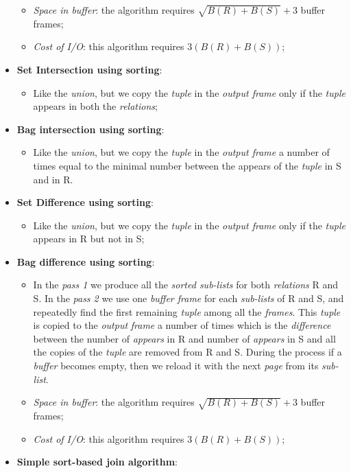 \documentclass{article}
\begin{document}
\begin{itemize}
\begin{itemize}
\item \emph{Space in buffer}: the algorithm requires $\sqrt{B(R) +B(S)} +3$ buffer frames;
\item \emph{Cost of I/O}: this algorithm requires $3(B(R)+B(S))$;
\end{itemize}
\item \textbf{Set Intersection using sorting}:
\begin{itemize}
\item Like the \emph{union}, but we copy the \emph{tuple} in the \emph{output frame} only if the \emph{tuple} appears in both the \emph{relations};
\end{itemize}
\item \textbf{Bag intersection using sorting}:
\begin{itemize}
\item Like the \emph{union}, but we copy the \emph{tuple} in the \emph{output frame} a number of times equal to the minimal number between the appears of the \emph{tuple} in S and in R. 
\end{itemize}
\item \textbf{Set Difference using sorting}:
\begin{itemize}
\item Like the \emph{union}, but we copy the \emph{tuple} in the \emph{output frame} only if the \emph{tuple} appears in R but not in S;
\end{itemize}
\item \textbf{Bag difference using sorting}:
\begin{itemize}
\item In the\emph{ pass 1} we produce all the \emph{sorted sub-lists} for both \emph{relations} R and S. In the \emph{pass 2} we use one \emph{buffer frame} for each \emph{sub-lists} of R and S, and repeatedly find the first remaining \emph{tuple} among all the \emph{frames}. This \emph{tuple} is copied to the \emph{output} \emph{frame} a number of times which is the \emph{difference} between the number of \emph{appears} in R and number of \emph{appears} in S and all the copies of the \emph{tuple} are removed from R and S. During the process if a \emph{buffer} becomes empty, then we reload it with the next \emph{page} from its \emph{sub-list}.
\item \emph{Space in buffer}: the algorithm requires $\sqrt{B(R) +B(S)} +3$ buffer frames;
\item \emph{Cost of I/O}: this algorithm requires $3(B(R)+B(S))$;
\end{itemize}
\item \textbf{Simple sort-based join algorithm}:

\end{itemize}
\end{document}
